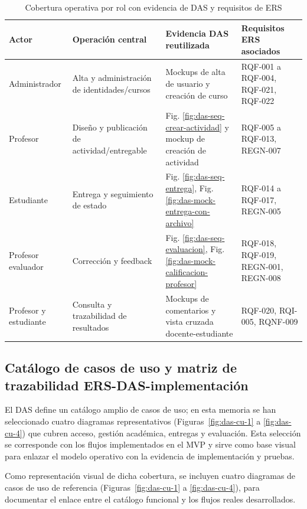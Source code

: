 
\begin{table}[!htbp]
\centering
\small
\begin{tabular}{|P{2.1cm}|P{3.4cm}|P{4.0cm}|P{2.8cm}|}
\hline
\textbf{Actor} & \textbf{Operaci\'on central} & \textbf{Evidencia DAS reutilizada} & \textbf{Requisitos ERS asociados} \\
\hline
Administrador & Alta y administraci\'on de identidades/cursos & Mockups de alta de usuario y creaci\'on de curso & RQF-001 a RQF-004, RQF-021, RQF-022 \\
\hline
Profesor & Dise\~no y publicaci\'on de actividad/entregable & Fig. \ref{fig:das-seq-crear-actividad} y mockup de creaci\'on de actividad & RQF-005 a RQF-013, REGN-007 \\
\hline
Estudiante & Entrega y seguimiento de estado & Fig. \ref{fig:das-seq-entrega}, Fig. \ref{fig:das-mock-entrega-con-archivo} & RQF-014 a RQF-017, REGN-005 \\
\hline
Profesor evaluador & Correcci\'on y feedback & Fig. \ref{fig:das-seq-evaluacion}, Fig. \ref{fig:das-mock-calificacion-profesor} & RQF-018, RQF-019, REGN-001, REGN-008 \\
\hline
Profesor y estudiante & Consulta y trazabilidad de resultados & Mockups de comentarios y vista cruzada docente-estudiante & RQF-020, RQI-005, RQNF-009 \\
\hline
\end{tabular}
\normalsize
\caption{Cobertura operativa por rol con evidencia de DAS y requisitos de ERS}
\label{tab:das-cobertura-rol}
\end{table}

\subsection{Cat\'alogo de casos de uso y matriz de trazabilidad ERS-DAS-implementaci\'on}

El DAS define un cat\'alogo amplio de casos de uso; en esta memoria se han
seleccionado cuatro diagramas representativos (Figuras~\ref{fig:das-cu-1} a
\ref{fig:das-cu-4}) que cubren acceso, gesti\'on acad\'emica, entregas y
evaluaci\'on. Esta selecci\'on se corresponde con los flujos implementados en el
MVP y sirve como base visual para enlazar el modelo operativo con la evidencia
de implementaci\'on y pruebas.

Como representaci\'on visual de dicha cobertura, se incluyen cuatro diagramas
de casos de uso de referencia (Figuras~\ref{fig:das-cu-1} a
\ref{fig:das-cu-4}), para documentar el enlace entre el cat\'alogo funcional y
los flujos reales desarrollados.

